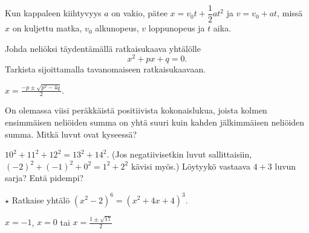 \begin{tehtavasivu}
\begin{tehtava}
    Kun kappaleen kiihtyvyys $a$ on vakio, pätee $x = v_0t + \dfrac{1}{2}at^2$ ja
    $v = v_0 + at$, missä $x$ on kuljettu matka, $v_0$ alkunopeus, $v$ loppunopeus ja $t$ aika.
		\begin{alakohdat}
        \end{alakohdat}
    \begin{vastaus}
        \begin{alakohdat}
        \end{alakohdat}
    \end{vastaus}
\end{tehtava}

\begin{tehtava}
	Johda neliöksi täydentämällä ratkaisukaava yhtälölle
	\[ x^2 +px+q=0. \]
	Tarkista sijoittamalla tavanomaiseen ratkaisukaavaan.
	\begin{vastaus}
		$x=\frac{-p \pm \sqrt{p^2-4q}}{2}$.
	\end{vastaus}
\end{tehtava}

\begin{tehtava} %
On olemassa viisi peräkkäistä positiivista kokonaislukua, joista kolmen
ensimmäisen neliöiden summa on yhtä suuri kuin kahden jälkimmäisen
neliöiden summa. Mitkä luvut ovat kyseessä?
    \begin{vastaus}
		$10^2+11^2+12^2 = 13^2 + 14^2$.
    	(Jos negatiivisetkin luvut sallittaisiin, $(-2)^2+(-1)^2+0^2 = 1^2 + 2^2$ kävisi 			myös.) Löytyykö vastaava $4 + 3$ luvun sarja? Entä pidempi?
    \end{vastaus}
\end{tehtava}

\begin{tehtava} %
	$\star$ Ratkaise yhtälö $(x^2-2)^6=(x^2+4x+4)^3$.
	\begin{vastaus}
		$x=-1$, $x=0$ tai $x=\frac{1 \pm \sqrt{17}}{2}$
	\end{vastaus}
\end{tehtava}



\end{tehtavasivu}

